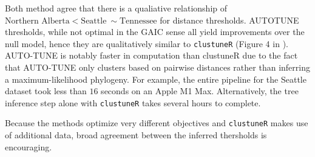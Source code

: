 \documentclass[utf8]{FrontiersinHarvard} %
\begin{document}
Both method agree that there is a qualiative relationship of $\text{Northern Alberta} < \text{Seattle} ~\sim \text{Tennessee}$ for distance thresholds.
AUTOTUNE thresholds, while not optimal in the GAIC sense all yield improvements over the null model, hence they are qualitatively similar to {\tt clustuneR}  (Figure 4 in \cite{chato_public_2020}).  AUTO-TUNE is notably faster in computation than
clustuneR due to the fact that AUTO-TUNE only clusters based on pairwise
distances rather than inferring a maximum-likelihood phylogeny. For example, the
entire pipeline for the Seattle dataset took less than $16$ seconds on an Apple M1
Max. Alternatively, the tree inference step alone with {\tt clustuneR} takes several
hours to complete.

Because the methods optimize very different objectives and {\tt clustuneR} makes use of additional data, broad agreement between the inferred thersholds is encouraging.


\end{document}
